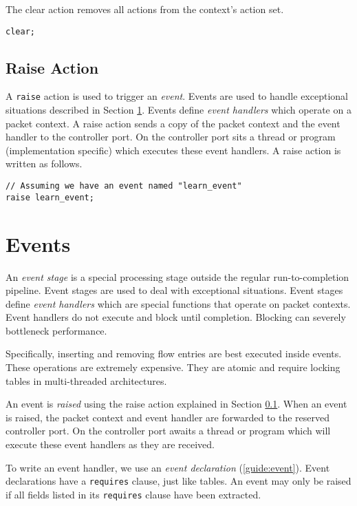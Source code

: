 The clear action removes all actions from the context's action set.

\begin{lstlisting}
clear;
\end{lstlisting}

\subsection{Raise Action} \label{tut:raise_action}

A \texttt{raise} action is used to trigger an \textit{event}. Events are used to handle exceptional situations described in Section \ref{tut:event}. Events define \textit{event handlers} which operate on a packet context. A raise action sends a copy of the packet context and the event handler to the controller port. On the controller port sits a thread or program (implementation specific) which executes these event handlers. A raise action is written as follows.

\begin{lstlisting}
// Assuming we have an event named "learn_event"
raise learn_event;
\end{lstlisting}

\section{Events} \label{tut:event}

An \textit{event stage} is a special processing stage outside the regular run-to-completion pipeline. Event stages are used to deal with exceptional situations. Event stages define \textit{event handlers} which are special functions that operate on packet contexts. Event handlers do not execute and block until completion. Blocking can severely bottleneck performance.

Specifically, inserting and removing flow entries are best executed inside events. These operations are extremely expensive. They are atomic and require locking tables in multi-threaded architectures.

An event is \textit{raised} using the raise action explained in Section \ref{tut:raise_action}. When an event is raised, the packet context and event handler are forwarded to the reserved controller port. On the controller port awaits a thread or program which will execute these event handlers as they are received.

To write an event handler, we use an \textit{event declaration} (\ref{guide:event}). Event declarations have a \texttt{requires} clause, just like tables. An event may only be raised if all fields listed in its \texttt{requires} clause have been extracted.

